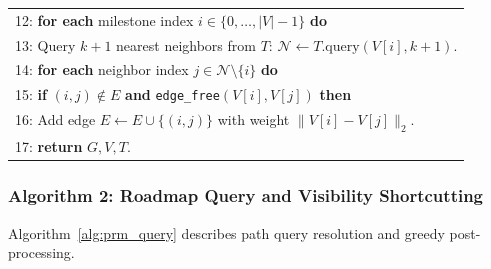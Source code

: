 \documentclass[12pt,a4paper]{article}
\begin{document}
\begin{table}[H]
\begin{tabular}{|p{\dimexpr\linewidth-2\tabcolsep-2\fboxrule\relax}|}
12: \textbf{for each} milestone index $i \in \{0, \dots, |V| - 1\}$ \textbf{do} \\
13: \quad Query $k+1$ nearest neighbors from $T$: $\mathcal{N} \leftarrow T.\text{query}(V[i], k+1)$. \\
14: \quad \textbf{for each} neighbor index $j \in \mathcal{N} \setminus \{i\}$ \textbf{do} \\
15: \qquad \textbf{if} $(i, j) \notin E$ \textbf{and} \texttt{edge\_free}$(V[i], V[j])$ \textbf{then} \\
16: \qquad \quad Add edge $E \leftarrow E \cup \{(i, j)\}$ with weight $\|V[i] - V[j]\|_2$. \\
17: \textbf{return} $G, V, T$. \\ \hline
\end{tabular}
\end{table}

\subsubsection{Algorithm 2: Roadmap Query and Visibility Shortcutting}
Algorithm~\ref{alg:prm_query} describes path query resolution and greedy post-processing.
\end{document}
